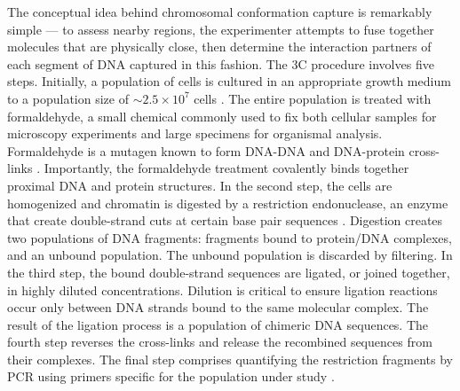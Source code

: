 The conceptual idea behind chromosomal conformation capture is remarkably simple --- to assess nearby regions, the experimenter attempts to fuse
together molecules that are physically close, then determine the interaction partners of each segment of DNA captured in this fashion.  The
\gls{3C} procedure involves five steps.   Initially, a population of cells is cultured in an appropriate growth medium to a population size
of $\sim2.5 \times 10^7$ cells \citep{berkum2010}.  The entire population is treated with formaldehyde, a small chemical commonly used to fix both
cellular samples for microscopy experiments and large specimens for organismal analysis.  Formaldehyde is a mutagen known to form DNA-DNA and
DNA-protein cross-links \citep{merk1998}.  Importantly, the formaldehyde treatment covalently binds together proximal DNA and protein structures.
In the second step, the cells are homogenized and chromatin is digested by a restriction endonuclease, an enzyme that create double-strand
cuts at certain base pair sequences \citep{berkum2010}.  Digestion creates two populations of DNA fragments: fragments bound to protein/DNA
complexes, and an unbound population.  The unbound population is discarded by filtering.  In the third step, the bound double-strand sequences
are ligated, or joined together, in highly diluted concentrations. Dilution is critical to ensure ligation reactions occur only between DNA
strands bound to the same molecular complex. The result of the ligation process is a population of chimeric DNA sequences. The fourth step
reverses the cross-links and release the recombined sequences from their complexes.  The final step comprises quantifying the restriction
fragments by PCR using primers specific for the population under study \citep{simonis2007}.

